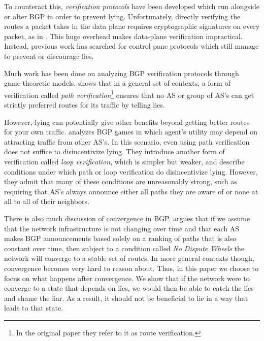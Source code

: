 \documentclass[10pt]{article}
\begin{document}
    To counteract this, \emph{verification protocols} have been developed which
    run alongside or alter BGP in order to prevent lying.
    Unfortunately, directly verifying the routes a packet takes in the data plane
    requires cryptographic signatures on every packet, as in \cite{DataPlane}.
    This huge overhead makes data-plane verification impractical.
    Instead, previous work has searched for control pane protocols
    which still manage to prevent or discourage lies.

    Much work has been done on analyzing BGP verification protocols
    through game-theoretic models.
    \cite{RoutingGames} shows that in a general set of contexts, a form of
    verification called \emph{path verification}\footnote{
      In the original
      paper they refer to it as route verification.}
    ensures that no AS or group of
    AS's can get strictly preferred routes for its traffic by telling lies.

    However, lying can potentially give other benefits beyond getting better
    routes for your own traffic.
    \cite{Attraction} analyzes BGP games in which agent's utility may depend
    on attracting traffic from other AS's.
    In this scenario, even using path verification does not suffice to
    disincentivize lying.
    They introduce another form of verification
    called \emph{loop verification}, which is simpler but weaker, and describe
    conditions under which path or loop verification do disincentivize lying.
    However, they admit that many of these conditions are unreasonably strong,
    such as requiring that AS's always announce either all paths they are aware
    of or none at all to all of their neighbors.

    There is also much discussion of convergence in BGP. \cite{RoutingGames}
    argues that if we assume that the network infrastructure is not changing
    over time and that each AS makes BGP announcements based solely on a ranking
    of paths that is also constant over time, then subject to a condition called
    \emph{No Dispute Wheels} the network will converge to a stable set of
    routes. In more general contexts though, convergence becomes very hard to
    reason about. Thus, in this paper we choose to focus on what happens after
    convergence. We show that if the network were to converge to a state that
    depends on lies, we would then be able to catch the lies and shame the liar.
    As a result, it should not be beneficial to lie in a way that leads to that
    state.
\end{document}
